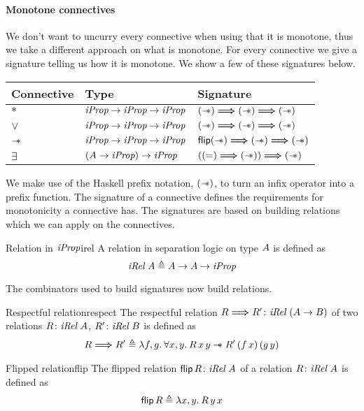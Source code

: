 \documentclass[thesis.tex]{subfiles}
\begin{document}
\paragraph*{Monotone connectives}
We don't want to uncurry every connective when using that it is monotone, thus we take a different approach on what is monotone. For every connective we give a signature telling us how it is monotone. We show a few of these signatures below.

\begin{center}
  \begin{tabular}{lll}
    Connective & Type                           & Signature                                           \\
    \hline
    $*$        & $\textit{iProp} \to \textit{iProp} \to \textit{iProp}$    & $(\mathrel{-\!\!\ast}) \mathrel{\bm{\Longrightarrow}} (\mathrel{-\!\!\ast}) \mathrel{\bm{\Longrightarrow}} (\mathrel{-\!\!\ast})$      \\
    $\lor$     & $\textit{iProp} \to \textit{iProp} \to \textit{iProp}$    & $(\mathrel{-\!\!\ast}) \mathrel{\bm{\Longrightarrow}} (\mathrel{-\!\!\ast}) \mathrel{\bm{\Longrightarrow}} (\mathrel{-\!\!\ast})$      \\
    $\mathrel{-\!\!\ast}$    & $\textit{iProp} \to \textit{iProp} \to \textit{iProp}$    & $\bm{\textsf{\upshape flip}}(\mathrel{-\!\!\ast}) \mathrel{\bm{\Longrightarrow}} (\mathrel{-\!\!\ast}) \mathrel{\bm{\Longrightarrow}} (\mathrel{-\!\!\ast})$ \\
    $\exists$  & $(A \to \textit{iProp}) \to \textit{iProp}$ & $((=) \mathrel{\bm{\Longrightarrow}} (\mathrel{-\!\!\ast})) \mathrel{\bm{\Longrightarrow}} (\mathrel{-\!\!\ast})$
  \end{tabular}
\end{center}
We make use of the Haskell prefix notation, $(\mathrel{-\!\!\ast})$, to turn an infix operator into a prefix function. The signature of a connective defines the requirements for monotonicity a connective has. The signatures are based on building relations which we can apply on the connectives.
\begin{definition}{Relation in $\textit{iProp}$}{irel}
  A relation in separation logic on type $A$ is defined as
  \[\textit{iRel}\ A \triangleq A \to A \to \textit{iProp}\]
\end{definition}
The combinators used to build signatures now build relations.
\begin{definition}{Respectful relation}{respect}
  The respectful relation $\rel \respect \rel'\colon \Rel\ (\sigax\to\sigaxB)$ of two relations $R\colon\textit{iRel}\ A$, $R'\colon\textit{iRel}\ B$ is defined as
  \begin{align*}
    \rel \respect \rel' \eqdef \Lam \func, \funcB. \All \var,\varB. \rel\, \var\, \varB \wand \rel'\, (\func\, \var)\, (\funcB\, \varB)
  \end{align*}
\end{definition}
\begin{definition}{Flipped relation}{flip}
  The flipped relation $\bm{\textsf{\upshape flip}}\, R\colon\textit{iRel}\ A$ of a relation $R\colon\textit{iRel}\ A$ is defined as
  \[\flip\, \rel \eqdef \Lam \var, \varB. \rel\, \varB\, \var\]
\end{definition}
\end{document}
